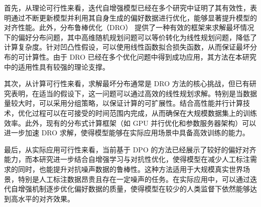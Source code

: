 首先，从理论可行性来看，迭代自增强模型已经在多个研究中证明了其有效性\citep{Kim2025Spread}，表明通过不断更新模型并利用其自身生成的偏好数据进行优化，能够显著提升模型的对齐性能。此外，分布鲁棒优化（DRO）\citep{Esfahani2018Data} 提供了一种有效的框架来求解最坏情况下的偏好分布问题，其中高维随机规划问题可以等价转化为线性规划问题，降低了计算复杂度。针对凹凸性假设，可以使用线性函数拟合损失函数，从而保证最坏分布的可计算性。由于 DRO 已经在多个优化问题中得到成功应用，其方法在本研究中的适用性具有较强的理论支撑。

其次，从计算可行性来看，求解最坏分布通常是 DRO 方法的核心挑战，但已有研究表明，在适当的假设下，这一问题可以通过高效的线性规划求解\citep{Esfahani2018Data}。特别是当数据量较大时，可以采用分组策略，以保证计算的可扩展性。结合高性能并行计算技术，优化过程可以在可接受的时间范围内完成，从而确保在大规模数据集上的训练效率。此外，现有的分布式计算框架（如 GPU 并行优化和参数服务器架构）可以进一步加速 DRO 求解，使得模型能够在实际应用场景中具备高效训练的能力。

最后，从实际应用可行性来看，当前基于 DPO 的方法已经展示了较好的偏好对齐能力，而本研究进一步结合自增强学习与对抗性优化，使得模型在减少人工标注需求的同时，也能提升对抗噪声数据的鲁棒性。这种方法适用于大规模真实世界场景，特别是人工标注数据昂贵且存在一定噪声的任务。在实际应用中，可以通过迭代自增强机制逐步优化偏好数据的质量，使得模型在较少的人类监督下依然能够达到高水平的对齐效果。
